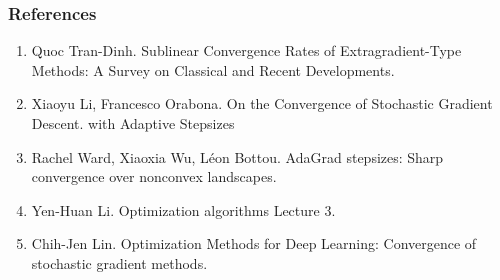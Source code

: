 \documentclass{beamer}
\begin{document}
\begin{frame}
\frametitle{References}
\begin{enumerate}
    \item Quoc Tran-Dinh. Sublinear Convergence Rates of Extragradient-Type Methods: A
Survey on Classical and Recent Developments. 
    \item Xiaoyu Li, Francesco Orabona. On the Convergence of Stochastic Gradient Descent.
with Adaptive Stepsizes
    \item Rachel Ward, Xiaoxia Wu, Léon Bottou. AdaGrad stepsizes: Sharp convergence over nonconvex
landscapes.
    \item Yen-Huan Li. Optimization algorithms Lecture 3.
    \item Chih-Jen Lin. Optimization Methods for Deep Learning: Convergence of stochastic gradient methods.
\end{enumerate}
\end{frame}
\end{document}
